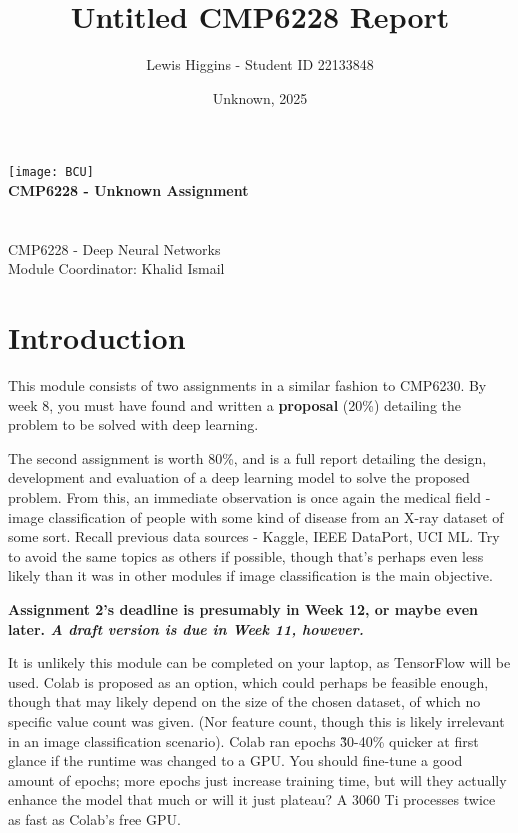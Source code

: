 \documentclass[12pt]{report}
\title{Untitled CMP6228 Report}
\author{Lewis Higgins - Student ID 22133848}
\date{Unknown, 2025}
\newcommand{\para}{\vspace{7pt}\noindent}
\begin{document}
\makeatletter
\begin{titlepage}
    \begin{center}
        \texttt{[image: BCU]}\\[4ex]
        {\huge \bfseries CMP6228 - Unknown Assignment}\\[2ex]
        {\large \bfseries  \@title}\\[50ex]
        {\@author}\\[2ex]
        {CMP6228 - Deep Neural Networks}\\[2ex]
        {Module Coordinator: Khalid Ismail}\\[10ex]
    \end{center}
\end{titlepage}
\makeatother
\thispagestyle{empty}
\newpage


\setcounter{page}{0}

\tableofcontents
\thispagestyle{empty}

\chapter*{Introduction}
This module consists of two assignments in a similar fashion to CMP6230. 
By week 8, you must have found and written a \textbf{proposal} (20\%) detailing 
the problem to be solved with deep learning.

\para The second assignment is worth 80\%, and is a full report detailing the design, development
and evaluation of a deep learning model to solve the proposed problem. From this, an immediate 
observation is once again the medical field - image classification of people with some kind of disease 
from an X-ray dataset of some sort. Recall previous data sources - Kaggle, IEEE DataPort, UCI ML. Try 
to avoid the same topics as others if possible, though that's perhaps even less likely than it was in other 
modules if image classification is the main objective.

\para \textbf{Assignment 2's deadline is presumably in Week 12, or maybe even later. 
\textit{A draft version is due in Week 11, however.} } 

\para It is unlikely this module can be completed on your laptop, as TensorFlow 
will be used. Colab is proposed as an option, which could perhaps be feasible enough, though 
that may likely depend on the size of the chosen dataset, of which no specific value 
count was given. (Nor feature count, though this is likely irrelevant in an image classification scenario).
Colab ran epochs \~30-40\% quicker at first glance if the runtime was changed to a GPU.
You should fine-tune a good amount of epochs; more epochs just increase training time, but will they actually 
enhance the model that much or will it just plateau? A 3060 Ti processes twice as fast as Colab's free GPU.
\end{document}
